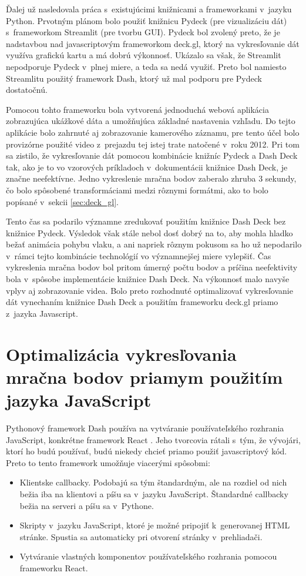 Ďalej už nasledovala práca s~existujúcimi knižnicami a frameworkami v~jazyku Python. Prvotným plánom bolo použiť knižnicu Pydeck (pre vizualizáciu dát) s~frameworkom Streamlit (pre tvorbu GUI). Pydeck bol zvolený preto, že je nadstavbou nad javascriptovým frameworkom deck.gl, ktorý na vykresľovanie dát využíva grafickú kartu a má dobrú výkonnosť. Ukázalo sa však, že Streamlit nepodporuje Pydeck v~plnej miere, a teda sa nedá využiť. Preto bol namiesto Streamlitu použitý framework Dash, ktorý už mal podporu pre Pydeck dostatočnú.

Pomocou tohto frameworku bola vytvorená jednoduchá webová aplikácia zobrazujúca ukážkové dáta a umožňujúca základné nastavenia vzhľadu. Do tejto aplikácie bolo zahrnuté aj zobrazovanie kamerového záznamu, pre tento účel bolo provizórne použité video z~prejazdu tej istej trate natočené v~roku 2012. Pri tom sa zistilo, že vykresľovanie dát pomocou kombinácie knižníc Pydeck a Dash Deck tak, ako je to vo vzorových príkladoch v~dokumentácii knižnice Dash Deck, je značne neefektívne. Jedno vykreslenie mračna bodov zaberalo zhruba 3 sekundy, čo bolo spôsobené transformáciami medzi rôznymi formátmi, ako to bolo popísané v~sekcii \ref{sec:deck_gl}.

Tento čas sa podarilo významne zredukovať použitím knižnice Dash Deck bez knižnice Pydeck. Výsledok však stále nebol dosť dobrý na to, aby mohla hladko bežať animácia pohybu vlaku, a ani napriek rôznym pokusom sa ho už nepodarilo v~rámci tejto kombinácie technológií vo významnejšej miere vylepšiť. Čas vykreslenia mračna bodov bol pritom úmerný počtu bodov a príčina neefektivity bola v~spôsobe implementácie knižnice Dash Deck. Na výkonnosť malo navyše vplyv aj zobrazovanie videa. Bolo preto rozhodnuté optimalizovať vykresľovanie dát vynechaním knižnice Dash Deck a použitím frameworku deck.gl priamo z~jazyka Javascript.

\section{Optimalizácia vykresľovania mračna bodov priamym použitím jazyka JavaScript}

Pythonový framework Dash používa na vytváranie používateľského rozhrania JavaScript, konkrétne framework React \cite{dash_documentation}. Jeho tvorcovia rátali s~tým, že vývojári, ktorí ho budú používať, budú niekedy chcieť priamo použiť javascriptový kód. Preto to tento framework umožňuje viacerými spôsobmi:

\begin{itemize}
    \item Klientske callbacky. Podobajú sa tým štandardným, ale na rozdiel od nich bežia iba na klientovi a píšu sa v~jazyku JavaScript. Štandardné callbacky bežia na serveri a píšu sa v~Pythone.
    \item Skripty v~jazyku JavaScript, ktoré je možné pripojiť k~generovanej HTML stránke. Spustia sa automaticky pri otvorení stránky v~prehliadači.
    \item Vytváranie vlastných komponentov používateľského rozhrania pomocou frameworku React.
\end{itemize}

